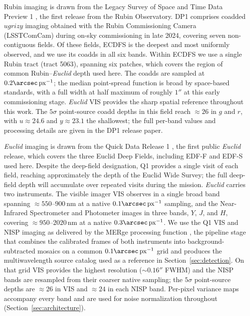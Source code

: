 \documentclass[twocolumn,linenumbers]{aastex701}
\newcommand{\arcsecpx}{\arcsec\,\mathrm{px}^{-1}}
\begin{document}
Rubin imaging is drawn from the Legacy Survey of Space and Time Data Preview 1 \citep[DP1;][]{DP1}, the first release from the Rubin Observatory. DP1 comprises coadded $ugrizy$ imaging obtained with the Rubin Commissioning Camera (LSSTComCam) during on-sky commissioning in late 2024, covering seven non-contiguous fields. Of these fields, ECDFS is the deepest and most uniformly observed, and we use its coadds in all six bands. Within ECDFS we use a single Rubin tract (tract 5063), spanning six patches, which covers the region of common Rubin--\textit{Euclid} depth used here. The coadds are sampled at $0.2\arcsecpx$; the median point-spread function is broad by space-based standards, with a full width at half maximum of roughly $1''$ at this early commissioning stage. \textit{Euclid} VIS provides the sharp spatial reference throughout this work. The $5\sigma$ point-source coadd depths in this field reach ${\approx}26$ in $g$ and $r$, with $u\approx24.6$ and $y\approx23.1$ the shallowest; the full per-band values and processing details are given in the DP1 release paper.

\textit{Euclid} imaging is drawn from the Quick Data Release 1 \citep[Q1;][]{EuclidQ1}, the first public \textit{Euclid} release, which covers the three Euclid Deep Fields, including EDF-F and EDF-S used here. Despite the deep-field designation, Q1 provides a single visit of each field, reaching approximately the depth of the Euclid Wide Survey; the full deep-field depth will accumulate over repeated visits during the mission. \textit{Euclid} carries two instruments. The visible imager VIS \citep{Cropper2025} observes in a single broad band spanning ${\approx}550$--$900$\,nm at a native $0.1\arcsecpx$ sampling, and the Near-Infrared Spectrometer and Photometer \citep[NISP;][]{Jahnke2025} images in three bands, $Y$, $J$, and $H$, covering ${\approx}950$--$2020$\,nm \citep{Schirmer2022} at a native $0.3\arcsecpx$. We use the Q1 VIS \citep{VIS} and NISP \citep{NIR} imaging as delivered by the MERge processing function \citep[MER;][]{MER}, the pipeline stage that combines the calibrated frames of both instruments into background-subtracted mosaics on a common $0.1\arcsecpx$ grid \citep{IRSA601} and produces the multiwavelength source catalog \citep{IRSA602} used as a reference in Section~\ref{sec:detection}. On that grid VIS provides the highest resolution ($\sim0.16''$ FWHM) and the NISP bands are resampled from their coarser native sampling; the $5\sigma$ point-source depths are $\approx26$ in VIS and $\approx24$ in each NISP band. Per-pixel variance maps accompany every band and are used for noise normalization throughout (Section~\ref{sec:architecture}).
\end{document}
